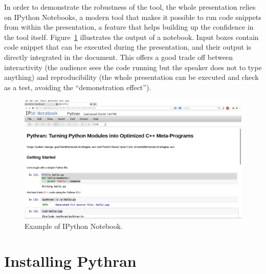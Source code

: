 \documentclass{llncs}
\begin{document}
In order to demonstrate the robustness of the tool, the whole presentation
relies on IPython Notebooks, a modern tool that makes it possible to
run code snippets from within the presentation, a feature that helps building
up the confidence in the tool itself. Figure~\ref{fig:notebook} illustrates the
output of a notebook. Input boxes contain code snippet that can be executed
during the presentation, and their output is directly integrated in the
document. This offers a good trade off between interactivity (the audience sees
the code running but the speaker does not to type anything) and reproducibility
(the whole presentation can be executed and check as a test, avoiding the
``demonstration effect'').

\begin{figure}
    \vspace{-1em}
    \includegraphics[width=\textwidth]{pythran-notebook}
    \caption{Example of IPython Notebook.}
    \label{fig:notebook}
    \vspace{-1em}
\end{figure}

%
%
%

\section*{Installing Pythran}
\label{sec:install}
\end{document}
